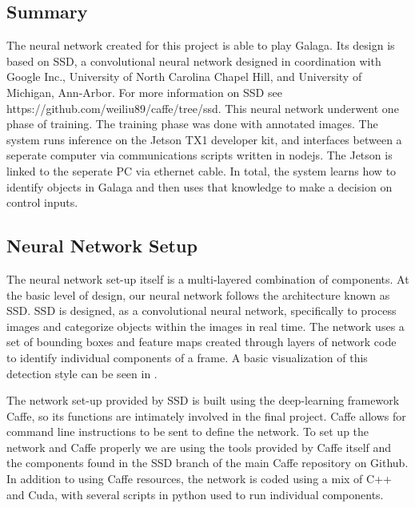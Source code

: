 \documentclass[onecolumn, draftclsnofoot,10pt, compsoc]{IEEEtran}
\begin{document}
\subsection{Summary}

The neural network created for this project is able to play Galaga.
Its design is based on SSD, a convolutional neural network designed in coordination with Google Inc.,  University of North Carolina Chapel Hill, and University of Michigan, Ann-Arbor.
For more information on SSD see https://github.com/weiliu89/caffe/tree/ssd.
This neural network underwent one phase of training.
The training phase was done with annotated images.
The system runs inference on the Jetson TX1 developer kit, and interfaces between a seperate computer via communications scripts written in nodejs.
The Jetson is linked to the seperate PC via ethernet cable.
In total, the system learns how to identify objects in Galaga and then uses that knowledge to make a decision on control inputs.

\subsection{Neural Network Setup}

The neural network set-up itself is a multi-layered combination of components.
At the basic level of design, our neural network follows the architecture known as SSD.
SSD is designed, as a convolutional neural network, specifically to process images and categorize objects within the images in real time.
The network uses a set of bounding boxes and feature maps created through layers of network code to identify individual components of a frame.
A basic visualization of this detection style can be seen in .

The network set-up provided by SSD is built using the deep-learning framework Caffe, so its functions are intimately involved in the final project.
Caffe allows for command line instructions to be sent to define the network.
To set up the network and Caffe properly we are using the tools provided by Caffe itself and the components found in the SSD branch of the main Caffe repository on Github.
In addition to using Caffe resources, the network is coded using a mix of C++ and Cuda, with several scripts in python used to run individual components.
\end{document}
